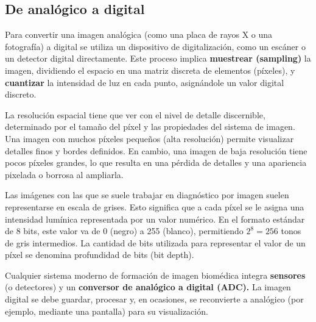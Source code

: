 \subsection{De analógico a digital}
Para convertir una imagen analógica (como una placa de rayos X o una fotografía) a digital se utiliza un dispositivo de digitalización, como un escáner o un detector digital directamente. Este proceso implica \textbf{muestrear (sampling)} la imagen, dividiendo el espacio en una matriz discreta de elementos (píxeles), y \textbf{cuantizar} la intensidad de luz en cada punto, asignándole un valor digital discreto.

La resolución espacial tiene que ver con el nivel de detalle discernible, determinado por el tamaño del píxel y las propiedades del sistema de imagen. Una imagen con muchos píxeles pequeños (alta resolución) permite visualizar detalles finos y bordes definidos. En cambio, una imagen de baja resolución tiene pocos píxeles grandes, lo que resulta en una pérdida de detalles y una apariencia pixelada o borrosa al ampliarla.

Las imágenes con las que se suele trabajar en diagnóstico por imagen suelen representarse en escala de grises. Esto significa que a cada píxel se le asigna una intensidad lumínica representada por un valor numérico. En el formato estándar de 8 bits, este valor va de 0 (negro) a 255 (blanco), permitiendo $2^8 = 256$ tonos de gris intermedios. La cantidad de bits utilizada para representar el valor de un píxel se denomina profundidad de bits (bit depth).

Cualquier sistema moderno de formación de imagen biomédica integra \textbf{sensores} (o detectores) y un \textbf{conversor de analógico a digital (ADC).} La imagen digital se debe guardar, procesar y, en ocasiones, se reconvierte a analógico (por ejemplo, mediante una pantalla) para su visualización.

